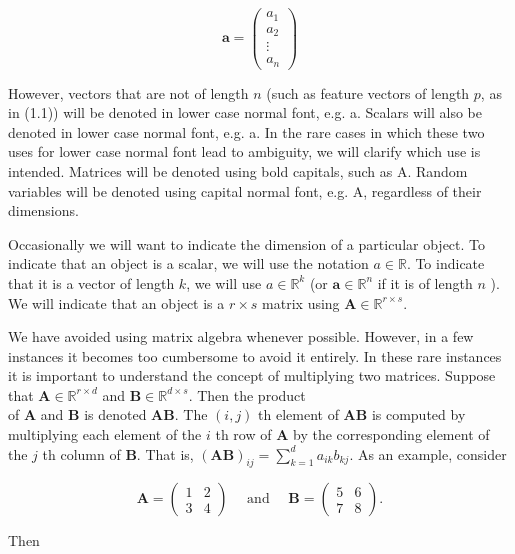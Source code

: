 \documentclass[10pt]{article}
\begin{document}
$$
\mathbf{a}=\left(\begin{array}{c}
a_{1} \\
a_{2} \\
\vdots \\
a_{n}
\end{array}\right)
$$

However, vectors that are not of length $n$ (such as feature vectors of length $p$, as in (1.1)) will be denoted in lower case normal font, e.g. a. Scalars will also be denoted in lower case normal font, e.g. a. In the rare cases in which these two uses for lower case normal font lead to ambiguity, we will clarify which use is intended. Matrices will be denoted using bold capitals, such as A. Random variables will be denoted using capital normal font, e.g. A, regardless of their dimensions.

Occasionally we will want to indicate the dimension of a particular object. To indicate that an object is a scalar, we will use the notation $a \in \mathbb{R}$. To indicate that it is a vector of length $k$, we will use $a \in \mathbb{R}^{k}$ (or $\mathbf{a} \in \mathbb{R}^{n}$ if it is of length $n$ ). We will indicate that an object is a $r \times s$ matrix using $\mathbf{A} \in \mathbb{R}^{r \times s}$.

We have avoided using matrix algebra whenever possible. However, in a few instances it becomes too cumbersome to avoid it entirely. In these rare instances it is important to understand the concept of multiplying two matrices. Suppose that $\mathbf{A} \in \mathbb{R}^{r \times d}$ and $\mathbf{B} \in \mathbb{R}^{d \times s}$. Then the product\\
of $\mathbf{A}$ and $\mathbf{B}$ is denoted $\mathbf{A B}$. The $(i, j)$ th element of $\mathbf{A B}$ is computed by multiplying each element of the $i$ th row of $\mathbf{A}$ by the corresponding element of the $j$ th column of $\mathbf{B}$. That is, $(\mathbf{A B})_{i j}=\sum_{k=1}^{d} a_{i k} b_{k j}$. As an example, consider

$$
\mathbf{A}=\left(\begin{array}{ll}
1 & 2 \\
3 & 4
\end{array}\right) \quad \text { and } \quad \mathbf{B}=\left(\begin{array}{ll}
5 & 6 \\
7 & 8
\end{array}\right) .
$$

Then
\end{document}
